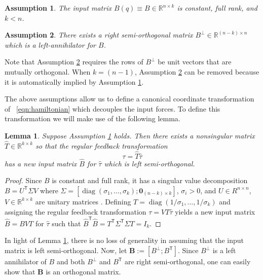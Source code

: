 \documentclass[journal,twoside,web]{ieeecolor}
\newtheorem{lemma}[thm]{Lemma} %
\newtheorem{assm}{Assumption} %
\DeclareMathOperator{\Diag}{diag}
\newcommand*{\diag}[1]{\Diag\left(#1\right)}
\newcommand*{\tpose}{^\mathsf{T}}
\newcommand*{\R}{\mathbb{R}}
\newcommand*{\Id}[1]{I_{#1}}
\newcommand*{\Zmat}[1]{\bm{0}_{#1}}
\begin{document}
\begin{assm}\label{assm:B-const}
    The input matrix \(B(q) \equiv B \in \R^{n\times k}\) is constant,
    full rank, and \(k < n\).
\end{assm}

\begin{assm}\label{assm:B-perp}
    There exists a right semi-orthogonal matrix 
    \(B^\perp \in \R^{(n-k)\times n}\)
    which is a left-annihilator for \(B\). 
\end{assm}

Note that Assumption \ref{assm:B-perp} requires the rows of \(B^\perp\) be unit vectors
that are mutually orthogonal. 
When \(k = (n-1)\), Assumption \ref{assm:B-perp} can be removed because it is
automatically implied by Assumption \ref{assm:B-const}.

The above assumptions allow us to define a
canonical coordinate transformation of ~\eqref{eqn:hamiltonian} 
which decouples the input forces.
To define this transformation we will make use of the following lemma.

\begin{lemma}\label{lemma:B-orthogonal}
    Suppose Assumption \ref{assm:B-const} holds. Then
    there exists a nonsingular matrix \(\hat{T} \in \R^{k \times k}\) 
    so that the regular feedback transformation 
    \[
        \tau = \hat{T} \hat{\tau}
    \] 
    has a new input matrix \(\hat{B}\) for \(\hat{\tau}\) which is left
    semi-orthogonal.  
\end{lemma}
\begin{proof}
    Since \(B\) is constant and full rank, it has a singular value decomposition 
    \(B = U\tpose \Sigma V\) where 
    \(\Sigma = [\diag{\sigma_1,\ldots,\sigma_k}; \Zmat{(n-k)\times k}]\),
    \(\sigma_i > 0\), and \(U \in R^{n \times n}\),
    \(V \in \R^{k \times k}\) are unitary matrices \cite{calculating_svd}.
    Defining \(T = \diag{1/\sigma_1,\ldots,1/\sigma_k}\) and assigning the
    regular feedback transformation \(\tau = V T \hat{\tau}\) yields a new input
    matrix \(\hat{B} = B V T\) for \(\hat{\tau}\) such that
    \(\hat{B}\tpose \hat{B} = T\tpose \Sigma\tpose \Sigma T = \Id{k}\).
\end{proof}

In light of Lemma \ref{lemma:B-orthogonal}, there is no loss of generality in
assuming that the input matrix is left semi-orthogonal.
Now, let \(\mathbf{B} := [B^\perp; B\tpose]\).
Since \(B^\perp\) is a left annihilator of \(B\) and both \(B^\perp\) and
\(B\tpose\) are right semi-orthogonal, one can easily show that \(\mathbf{B}\) is
an orthogonal matrix.
\end{document}
